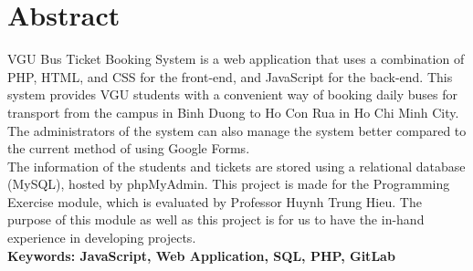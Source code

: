 \section{Abstract}
\noindent VGU Bus Ticket Booking System is a web application that uses a combination of PHP, HTML, and CSS for the front-end, and JavaScript for the back-end. This system provides VGU students with a convenient way of booking daily buses for transport from the campus in Binh Duong to Ho Con Rua in Ho Chi Minh City. The administrators of the system can also manage the system better compared to the current method of using Google Forms.\\
The information of the students and tickets are stored using a relational database (MySQL), hosted by phpMyAdmin.
This project is made for the Programming Exercise module, which is evaluated by Professor Huynh Trung Hieu. The purpose of this module as well as this project is for us to have the in-hand experience in developing projects.
\\ \textbf{Keywords: JavaScript, Web Application, SQL, PHP, GitLab}
